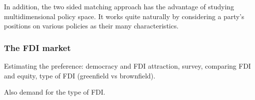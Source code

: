 In addition, the two sided matching approach has the advantage of studying
multidimensional policy space. It works quite naturally by considering a party's
positions on various policies as their many characteristics.

\subsubsection{The FDI market}

Estimating the preference: democracy and FDI attraction, survey, comparing FDI
and equity, type of FDI (greenfield vs brownfield).

Also demand for the type of FDI.
